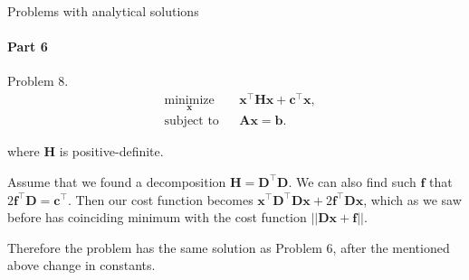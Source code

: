 \documentclass{beamer}
\begin{document}
\begin{frame}{Problems with analytical solutions}
\framesubtitle{Part 6}
\begin{flushleft}

Problem 8. 
%
\begin{equation}
\begin{aligned}
& \underset{\mathbf{x}}{\text{minimize}}
& & \mathbf{x}^\top \mathbf{H} \mathbf{x} + \mathbf{c}^\top\mathbf{x}, \\
& \text{subject to}
& & \mathbf{A} \mathbf{x} = \mathbf{b}.
\end{aligned}
\end{equation}

where $\mathbf{H}$ is positive-definite.

\bigskip

Assume that we found a decomposition $\mathbf{H} = \mathbf{D}^\top\mathbf{D}$. We can also find such $\mathbf{f}$ that $2\mathbf{f}^\top\mathbf{D} = \mathbf{c}^\top$. Then our cost function becomes $\mathbf{x}^\top \mathbf{D}^\top\mathbf{D} \mathbf{x} + 2\mathbf{f}^\top\mathbf{D}\mathbf{x}$, which as we saw before has coinciding minimum with the cost function $||\mathbf{D}\mathbf{x} + \mathbf{f}||$.

\bigskip

Therefore the problem has the same solution as Problem 6, after the mentioned above change in constants.

\end{flushleft}
\end{frame}
\end{document}
